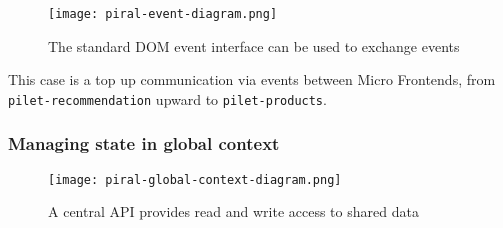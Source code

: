 \documentclass[a4paper]{book}
\begin{document}
\begin{figure}[h!]
  \centering
  \captionsetup{justification=centering}
  \texttt{[image: piral-event-diagram.png]}
  \caption{The standard DOM event interface can be used to exchange events \cite{Rap20}}
  \label{fig:piral-event-diagram}
\end{figure}

This case is a top up communication via events between Micro Frontends, from \verb|pilet-recommendation| upward to \verb|pilet-products|.  

\subsubsection{Managing state in global context}

\begin{figure}[h!]
  \centering
  \captionsetup{justification=centering}
  \texttt{[image: piral-global-context-diagram.png]}
  \caption{A central API provides read and write access to shared data \cite{Rap20}}
  \label{fig:piral-global-context-diagram}
\end{figure}
\end{document}
